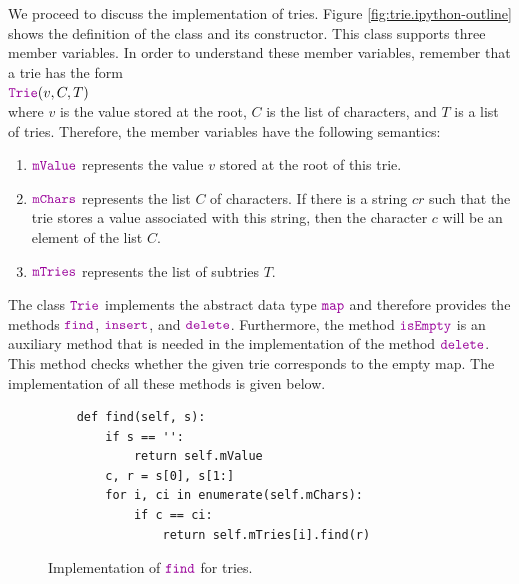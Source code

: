 \noindent
We proceed to discuss the implementation of tries.  Figure \ref{fig:trie.ipython-outline} shows the
definition of the class  and its constructor.  This class supports three member variables.  In order to
understand these member variables, remember that a trie has the form
\\[0.2cm]
\hspace*{1.3cm}
$\mytt{Trie}(v, C, T)$
\\[0.2cm]
where $v$ is the value stored at the root, $C$ is the list of characters, and $T$ is a list of
tries.  Therefore, the member variables have the following semantics:
\begin{enumerate}
\item $\mytt{mValue}$ represents the value $v$ stored at the root of this trie.
\item $\mytt{mChars}$ represents the list  $C$ of characters.  If there is a string $cr$ such that
      the trie stores a value associated with this string, then the character $c$ will be an element of
      the list $C$.
\item $\mytt{mTries}$ represents the list of subtries $T$.  
\end{enumerate}
The class $\mytt{Trie}$ implements the abstract data type $\mytt{map}$ and therefore provides the
methods $\mytt{find}$, $\mytt{insert}$, and $\mytt{delete}$.  Furthermore, the method
$\mytt{isEmpty}$ is an auxiliary method that is needed in the implementation of the method 
$\mytt{delete}$.  This method checks whether the given trie corresponds to the empty map.  The
implementation of all these methods is given below. 

\begin{figure}[!ht]
\centering
\begin{verbatim}
    def find(self, s):
        if s == '':
            return self.mValue
        c, r = s[0], s[1:]
        for i, ci in enumerate(self.mChars):
            if c == ci:
                return self.mTries[i].find(r)
\end{verbatim}
\vspace*{-0.3cm}
\caption{Implementation of $\mytt{find}$ for tries.}
\label{fig:trie.ipython-find}
\end{figure}

